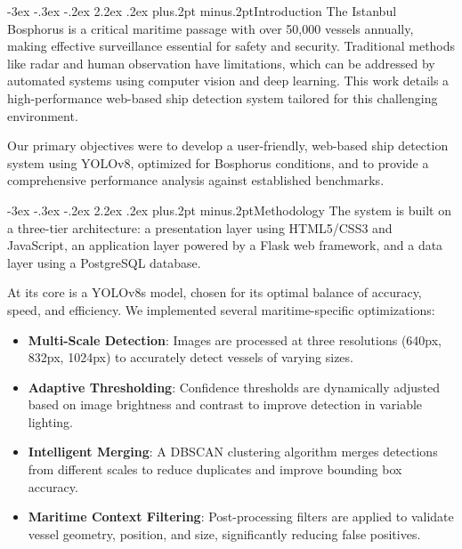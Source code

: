 \documentclass[twoside]{article}
\makeatletter
\def\section{\@startsection{section}{1}{\z@}%
 {-3ex \@plus -.3ex \@minus -.2ex}%
 {2.2ex \@plus.2ex}%
{\normalfont\normalsize\protect\baselineskip=14.5pt plus.2pt minus.2pt\bfseries}}
\makeatother
\begin{document}
\begin{multicols}{2}

\section{Introduction}
The Istanbul Bosphorus is a critical maritime passage with over 50,000 vessels annually, making effective surveillance essential for safety and security\cite{bosphorus_traffic}. Traditional methods like radar and human observation have limitations, which can be addressed by automated systems using computer vision and deep learning\cite{traditional_methods1,traditional_methods2}. This work details a high-performance web-based ship detection system tailored for this challenging environment.

Our primary objectives were to develop a user-friendly, web-based ship detection system using YOLOv8, optimized for Bosphorus conditions, and to provide a comprehensive performance analysis against established benchmarks.

\section{Methodology}
The system is built on a three-tier architecture: a presentation layer using HTML5/CSS3 and JavaScript, an application layer powered by a Flask web framework, and a data layer using a PostgreSQL database\cite{system_architecture}.

At its core is a YOLOv8s model, chosen for its optimal balance of accuracy, speed, and efficiency\cite{yolov8_performance}. We implemented several maritime-specific optimizations:
\begin{itemize}
    \item \textbf{Multi-Scale Detection}: Images are processed at three resolutions (640px, 832px, 1024px) to accurately detect vessels of varying sizes\cite{multiscale_detection}.
    \item \textbf{Adaptive Thresholding}: Confidence thresholds are dynamically adjusted based on image brightness and contrast to improve detection in variable lighting\cite{adaptive_thresholding}.
    \item \textbf{Intelligent Merging}: A DBSCAN clustering algorithm merges detections from different scales to reduce duplicates and improve bounding box accuracy\cite{dbscan_clustering1,dbscan_clustering2}.
    \item \textbf{Maritime Context Filtering}: Post-processing filters are applied to validate vessel geometry, position, and size, significantly reducing false positives\cite{context_filtering1,context_filtering2}.
\end{itemize}


\end{multicols}
\end{document}
